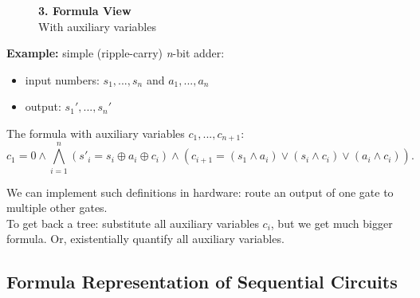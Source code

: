 \documentclass[11pt]{article}
\begin{document}
\begin{figure}[htbp]
\begin{minipage}{0.31\textwidth}
    \end{minipage}
    \hfill
    \begin{minipage}{0.33\textwidth}
        \centering
        \textbf{3. Formula View} \\[0.5em]
        \small With auxiliary variables \\[0.5em]
    \end{minipage}
    \label{fig:tree_to_dag}
\end{figure}

\textbf{Example:} simple (ripple-carry) \textit{n}-bit adder:
\begin{itemize}
	\item input numbers: $s_1, ..., s_n$ and $a_1,...,a_n$
	\item output: $s_1', ..., s_n'$
\end{itemize}

The formula with auxiliary variables $c_1, ..., c_{n+1}$: 
\[
	c_1 = 0 \land \bigwedge^{n}_{i = 1} (s'_i = s_i \oplus a_i \oplus c_i) \land (c_{i + 1} = (s_1 \land a_i) \lor (s_i \land c_i) \lor (a_i \land c_i)) 
.\] 

We can implement such definitions in hardware: route an output of one gate to multiple other gates. \\ 
To get back a tree: substitute all auxiliary variables $c_i$, but we get much bigger formula. Or, existentially quantify all auxiliary variables. 


\subsection*{Formula Representation of Sequential Circuits}
\end{document}
